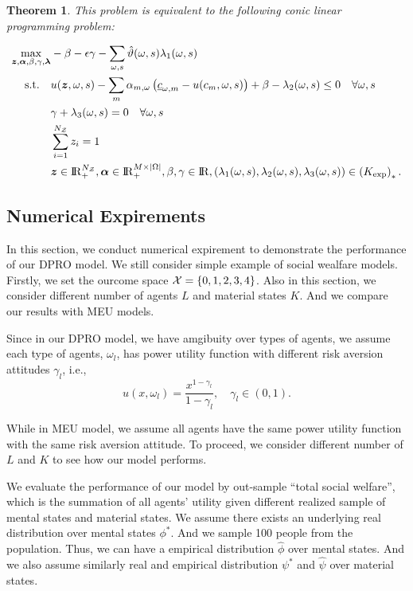 \documentclass[11pt,oneside]{article}
\theoremstyle{plain}
\theoremstyle{plain}
\theoremstyle{plain}
\newtheorem{thm}{Theorem}[section]
\theoremstyle{plain}
\theoremstyle{plain}
\theoremstyle{definition}
\theoremstyle{definition}
\theoremstyle{remark}
\theoremstyle{plain}
\newcommand{\R}{{\rm I\!R}}
\renewcommand{\Re}{\R}
\renewcommand{\Re}{\R}
\newcommand{\mcx}{{\cal X}}
\begin{document}
\begin{thm}
This problem is equivalent to the following conic linear programming problem: 

    \begin{align*}
        \max_{\boldsymbol{z},\boldsymbol{\alpha},\beta,\gamma, \boldsymbol{\lambda}} & -\beta - \epsilon \gamma - \sum_{\omega,s} \hat{\vartheta}(\omega,s)\lambda_1(\omega,s)\\
    \text{s.t.} \quad &u(\boldsymbol{z},\omega,s) - \sum_m \alpha_{m,\omega} \left( \underline{c}_{\omega,m} - u(c_m,\omega,s)\right) + \beta - \lambda_2(\omega,s) \leq 0 \quad \forall \omega,s\\
    & \gamma + \lambda_3(\omega,s) = 0 \quad \forall \omega,s\\
    & \sum_{i=1}^{N_\mathcal{Z}} z_i = 1 \\
    & \boldsymbol{z}\in\R^{N_\mathcal{Z}}_+ ,\boldsymbol{\alpha} \in \R_+^{M\times |\Omega|}, \beta , \gamma \in \Re, (\lambda_1(\omega,s), \lambda_2(\omega,s),\lambda_3(\omega,s))\in \left(K_{\text{exp}}\right)_*.
    \end{align*}
\end{thm}

\subsection{Numerical Expirements}
In this section, we conduct numerical expirement to demonstrate the performance of our DPRO model. We still consider simple example of social wealfare models.
Firstly, we set the ourcome space $\mcx = \{ 0,1,2,3,4 \}$. Also in this section, we consider different number of agents $L$ and material states $K$.
And we compare our results with MEU models.

Since in our DPRO model, we have amgibuity over types of agents, we assume each type of agents, $\omega_l$, has power utility function with different risk aversion attitudes $\gamma_l$, i.e.,
$$
u(x,\omega_l) = \frac{x^{1-\gamma_l}}{1-\gamma_l}, \quad  \gamma_l \in (0,1).
$$

While in MEU model, we assume all agents have the same power utility function with the same risk aversion attitude. To proceed, we consider different number of
$L$ and $K$ to see how our model performs. 

We evaluate the performance of our model by out-sample ``total social welfare'', which is the summation of all agents' utility given different realized sample of mental states and material states.
We assume there exists an underlying real distribution over mental states $\phi^*$. And we sample 100 people from the population. Thus, we can have a 
empirical distribution $\hat{\phi}$ over mental states. And we also assume similarly real and empirical distribution $\psi^*$ and $\hat{\psi}$ over material states.
\end{document}
